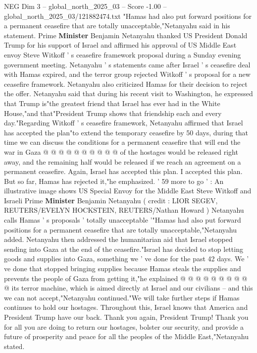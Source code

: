 \begin{textsample}{NEG Dim 3 – global\_north\_2025\_03 – Score -1.00 – global\_north\_2025\_03/121882474.txt}  \label{ex:f3_neg_436}
"Hamas had also put forward positions for a permanent ceasefire that are totally unacceptable,"Netanyahu said in his statement.
Prime \textbf{Minister} Benjamin Netanyahu thanked US President Donald Trump for his support of Israel and affirmed his approval of US Middle East envoy Steve Witkoff ' s ceasefire framework proposal during a Sunday evening government meeting.
Netanyahu ' s statements came after Israel ' s ceasefire deal with Hamas expired, and the terror group rejected Witkoff ' s proposal for a new ceasefire framework.
Netanyahu also criticized Hamas for their decision to reject the offer.
Netanyahu said that during his recent visit to Washington, he expressed that Trump is"the greatest friend that Israel has ever had in the White House,"and that"President Trump shows that friendship each and every day."Regarding Witkoff ' s ceasefire framework, Netanyahu affirmed that Israel has accepted the plan"to extend the temporary ceasefire by 50 days, during that time we can discuss the conditions for a permanent ceasefire that will end the war in Gaza @ @ @ @ @ @ @ @ @ @ of the hostages would be released right away, and the remaining half would be released if we reach an agreement on a permanent ceasefire.
Again, Israel has accepted this plan.
I accepted this plan.
But so far, Hamas has rejected it,"he emphasized. ' 59 more to go ' : An illustrative image shows US Special Envoy for the Middle East Steve Witkoff and Israeli Prime \textbf{Minister} Benjamin Netanyahu ( credit : LIOR SEGEV, REUTERS/EVELYN HOCKSTEIN, REUTERS/Nathan Howard ) Netanyahu calls Hamas ' s proposals ' totally unacceptable '"Hamas had also put forward positions for a permanent ceasefire that are totally unacceptable,"Netanyahu added.
Netanyahu then addressed the humanitarian aid that Israel stopped sending into Gaza at the end of the ceasefire."Israel has decided to stop letting goods and supplies into Gaza, something we ' ve done for the past 42 days.
We ' ve done that stopped bringing supplies because Hamas steals the supplies and prevents the people of Gaza from getting it,"he explained @ @ @ @ @ @ @ @ @ @ its terror machine, which is aimed directly at Israel and our civilians -- and this we can not accept,"Netanyahu continued."We will take further steps if Hamas continues to hold our hostages.
Throughout this, Israel knows that America and President Trump have our back.
Thank you again, President Trump!
Thank you for all you are doing to return our hostages, bolster our security, and provide a future of prosperity and peace for all the peoples of the Middle East,"Netanyahu stated.

\end{textsample}
